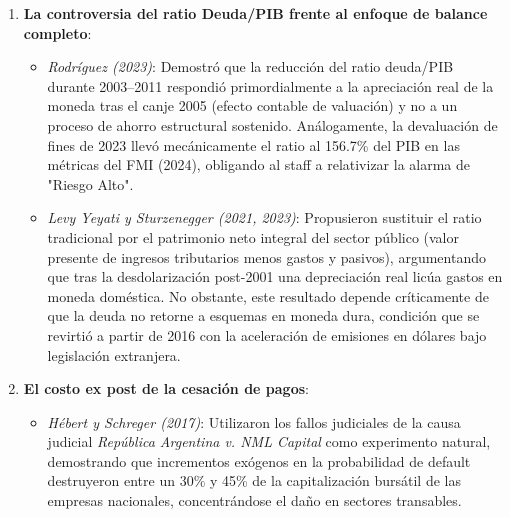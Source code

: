 \documentclass[11pt,a4paper]{article}
\begin{document}
\begin{enumerate}[leftmargin=1.5em]
    \item \textbf{La controversia del ratio Deuda/PIB frente al enfoque de balance completo}:
    \begin{itemize}
        \item \textit{Rodríguez (2023)}: Demostró que la reducción del ratio deuda/PIB durante 2003--2011 respondió primordialmente a la apreciación real de la moneda tras el canje 2005 (efecto contable de valuación) y no a un proceso de ahorro estructural sostenido. Análogamente, la devaluación de fines de 2023 llevó mecánicamente el ratio al 156.7\% del PIB en las métricas del FMI (2024), obligando al staff a relativizar la alarma de "Riesgo Alto".
        \item \textit{Levy Yeyati y Sturzenegger (2021, 2023)}: Propusieron sustituir el ratio tradicional por el patrimonio neto integral del sector público (valor presente de ingresos tributarios menos gastos y pasivos), argumentando que tras la desdolarización post-2001 una depreciación real licúa gastos en moneda doméstica. No obstante, este resultado depende críticamente de que la deuda no retorne a esquemas en moneda dura, condición que se revirtió a partir de 2016 con la aceleración de emisiones en dólares bajo legislación extranjera.
    \end{itemize}

    \item \textbf{El costo ex post de la cesación de pagos}:
    \begin{itemize}
        \item \textit{Hébert y Schreger (2017)}: Utilizaron los fallos judiciales de la causa judicial \textit{República Argentina v. NML Capital} como experimento natural, demostrando que incrementos exógenos en la probabilidad de default destruyeron entre un 30\% y 45\% de la capitalización bursátil de las empresas nacionales, concentrándose el daño en sectores transables.
    \end{itemize}
\end{enumerate}
\end{document}
